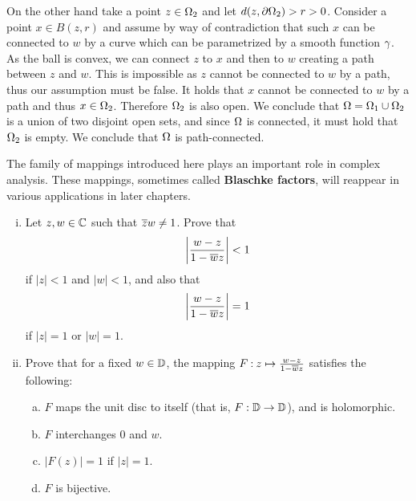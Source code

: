\documentclass[12pt]{memoir}
\begin{document}
\begin{ptcbr}
\begin{enumerate}[i)]
        On the other hand take a point $z\in\Omega_2$ and let $d(z,\partial\Omega_2)>r>0$. Consider a point $x\in B(z,r)$ and assume by way of contradiction that such $x$ can be connected to $w$ by a curve which can be parametrized by a smooth function $\gamma$. As the ball is convex, we can connect $z$ to $x$ and then to $w$ creating a path between $z$ and $w$. This is impossible as $z$ cannot be connected to $w$ by a path, thus our assumption must be false. It holds that $x$ cannot be connected to $w$ by a path and thus $x\in\Omega_2$. Therefore $\Omega_2$ is also open. We conclude that $\Omega=\Omega_1\cup\Omega_2$ is a union of two disjoint open sets, and since $\Omega$ is connected, it must hold that $\Omega_2$ is empty. We conclude that $\Omega$ is path-connected. 
    \end{enumerate}
\end{ptcbr}

\begin{Ej}
    The family of mappings introduced here plays an important role in complex analysis. These mappings, sometimes called \textbf{Blaschke factors}, will reappear in various applications in later chapters.
    \begin{enumerate}[i)]
        \itemsep=-0.4em
        \item Let $z,w\in\mathbb{C}$ such that $\overline{z}w\neq 1$. Prove that 
        $$\left|\frac{w-z}{1-\overline w z}\right|<1$$
        if $|z|<1$ and $|w|<1$, and also that 
        $$\left|\frac{w-z}{1-\overline w z}\right|=1$$
        if $|z|=1$ or $|w|=1$. 
        \item Prove that for a fixed $w\in\mathbb{D}$, the mapping $F\mathbin{:}z\mapsto\frac{w-z}{1-\overline w z}$ satisfies the following:
        \begin{enumerate}[a)]
            \itemsep=-0.4em
            \item $F$ maps the unit disc to itself (that is, $F:\mathbb{D}\to\mathbb{D}$), and is holomorphic.
            \item $F$ interchanges $0$ and $w$. 
            \item $|F(z)|=1$ if $|z|=1$.
            \item $F$ is bijective. 
        \end{enumerate}
    \end{enumerate}
    \end{Ej}
\end{document}
